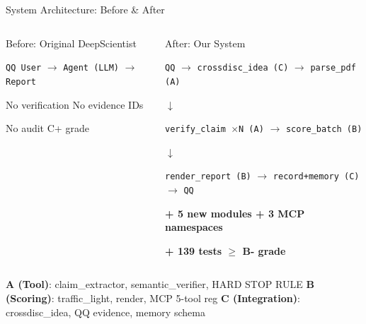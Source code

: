 \documentclass[aspectratio=169,11pt]{beamer}
\begin{document}
\begin{frame}{System Architecture: Before \& After}
  \begin{columns}[T]
    \begin{block}{Before: Original DeepScientist}
      \begin{center}
        \texttt{QQ User} $\to$ \texttt{Agent (LLM)} $\to$ \texttt{Report}

        \vspace{0.3cm}
        \footnotesize
        No verification \hspace{0.3cm} No evidence IDs

        No audit \hspace{0.8cm} C+ grade
      \end{center}
    \end{block}

    \begin{block}{After: Our System}
      \begin{center}
        \footnotesize
        \texttt{QQ} $\to$ \texttt{crossdisc\_idea (C)} $\to$ \texttt{parse\_pdf (A)}

        $\downarrow$

        \texttt{verify\_claim $\times$N (A)} $\to$ \texttt{score\_batch (B)}

        $\downarrow$

        \texttt{render\_report (B)} $\to$ \texttt{record+memory (C)} $\to$ \texttt{QQ}

        \vspace{0.2cm}
        \textbf{+ 5 new modules \hspace{0.2cm} + 3 MCP namespaces}

        \textbf{+ 139 tests \hspace{0.2cm} $\ge$ B- grade}
      \end{center}
    \end{block}
  \end{columns}

  \vspace{0.2cm}
  \begin{center}
    \footnotesize
    \textbf{A (Tool)}: claim\_extractor, semantic\_verifier, HARD STOP RULE \quad
    \textbf{B (Scoring)}: traffic\_light, render, MCP 5-tool reg \quad
    \textbf{C (Integration)}: crossdisc\_idea, QQ evidence, memory schema
  \end{center}
\end{frame}
\end{document}
